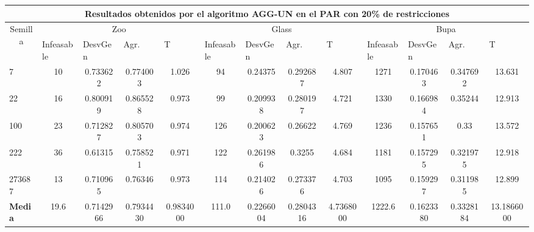 \begin{table}[H]
	\tiny

	\begin{adjustwidth}{-1cm}{-1cm}%
	
	\begin{tabular}{|l|c|c|c|c|c|c|c|c|c|c|c|c|}
	\hline
	\multicolumn{13}{|c|}{\textbf{Resultados obtenidos por el algoritmo AGG-UN en el PAR con 20\% de restricciones}}                                                                                                                                                                                                                                                                                                                                            \\ \hline
	\multicolumn{1}{|c|}{\multirow{2}{*}{Semilla}} & \multicolumn{4}{c|}{Zoo}                                                                                          & \multicolumn{4}{c|}{Glass}                                                                                         & \multicolumn{4}{c|}{Bupa}                                                                                          \\ \cline{2-13} 
	\multicolumn{1}{|c|}{}                                  & \multicolumn{1}{l|}{Infeasable} & \multicolumn{1}{l|}{DesvGen} & \multicolumn{1}{l|}{Agr.} & \multicolumn{1}{l|}{T} & \multicolumn{1}{l|}{Infeasable} & \multicolumn{1}{l|}{DesvGen} & \multicolumn{1}{l|}{Agr.} & \multicolumn{1}{l|}{T} & \multicolumn{1}{l|}{Infeasable} & \multicolumn{1}{l|}{DesvGen} & \multicolumn{1}{l|}{Agr.} & \multicolumn{1}{l|}{T} \\ \hline
	7   	& 10 & 0.733622 & 0.774003 & 1.026 & 			94 & 0.24375 & 0.292687 & 4.807 &			 	1271 & 0.170463 & 0.347692 & 13.631 		\\ \hline
	22 		& 16 & 0.800919 & 0.865528 &	0.973 &			99 & 0.209938 & 0.280197 &	4.721 &		 	1330 & 0.166984 & 0.35244 &	12.913		\\ \hline
	100 	& 23 & 0.712827 & 0.805703 &	0.974 &			126 & 0.200623 & 0.26622 & 	4.769 &			1236 & 0.157651 & 0.33 &	13.572		\\ \hline
	222 	& 36 & 0.61315 & 0.758521 & 0.971 &				122 & 0.261986 & 0.3255 & 	4.684 &			1181 & 0.157295 & 0.321975 &	12.918		\\ \hline
	273687 	& 13 & 0.710965 & 0.76346 & 0.973 & 			114 & 0.214026 & 0.273376 &  4.703 &			1095 & 0.159297 & 0.311985 &	12.899		\\ \hline
	\textbf{Media} &  19.6 & 	0.7142966 & 	0.7934430 & 	0.9834000 & 	111.0 & 	0.2266004 & 	0.2804316 & 	4.7368000 & 	1222.6	 & 0.1623380 & 	0.3328184 & 	13.1866000  \\ \hline
	\end{tabular}
	
	\end{adjustwidth}
	
\end{table}	

